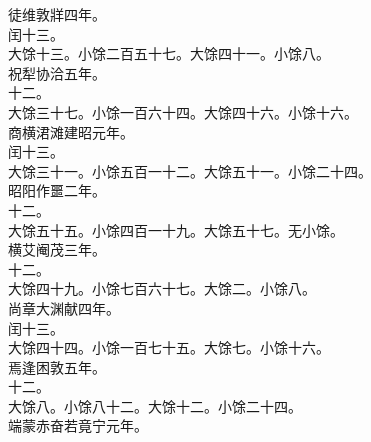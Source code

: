 \documentclass{zhvt-classic}
\begin{document}
\hspace*{2em}徒维敦牂四年。\\
\hspace*{2em}闰十三。\\
\hspace*{2em}大馀十三。小馀二百五十七。大馀四十一。小馀八。\\
\hspace*{2em}祝犁协洽五年。\\
\hspace*{2em}十二。\\
\hspace*{2em}大馀三十七。小馀一百六十四。大馀四十六。小馀十六。\\
\hspace*{2em}商横涒滩建昭元年。\\
\hspace*{2em}闰十三。\\
\hspace*{2em}大馀三十一。小馀五百一十二。大馀五十一。小馀二十四。\\
\hspace*{2em}昭阳作噩二年。\\
\hspace*{2em}十二。\\
\hspace*{2em}大馀五十五。小馀四百一十九。大馀五十七。无小馀。\\
\hspace*{2em}横艾阉茂三年。\\
\hspace*{2em}十二。\\
\hspace*{2em}大馀四十九。小馀七百六十七。大馀二。小馀八。\\
\hspace*{2em}尚章大渊献四年。\\
\hspace*{2em}闰十三。\\
\hspace*{2em}大馀四十四。小馀一百七十五。大馀七。小馀十六。\\
\hspace*{2em}焉逢困敦五年。\\
\hspace*{2em}十二。\\
\hspace*{2em}大馀八。小馀八十二。大馀十二。小馀二十四。\\
\hspace*{2em}端蒙赤奋若竟宁元年。\\
\end{document}
